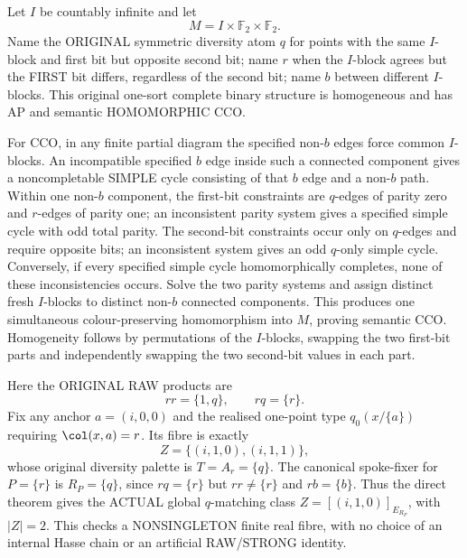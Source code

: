 \begin{example}
\label{ex:rh-direct-spoke-fixer-two-point}
Let $I$ be countably infinite and let
\[
                    M=I\times\mathbb F_2\times\mathbb F_2 .
\]
Name the ORIGINAL symmetric diversity
atom $q$ for points with the same
$I$-block and first bit but opposite
second bit; name $r$ when the
$I$-block agrees but the FIRST bit
differs, regardless of the second bit;
name $b$ between different $I$-blocks.
This original one-sort complete binary
structure is homogeneous and has AP
and semantic HOMOMORPHIC CCO.

For CCO, in any finite partial diagram
the specified non-$b$ edges force
common $I$-blocks. An incompatible
specified $b$ edge inside such a
connected component gives a
noncompletable SIMPLE cycle consisting
of that $b$ edge and a non-$b$ path.
Within one non-$b$ component, the
first-bit constraints are
$q$-edges of parity zero and
$r$-edges of parity one; an
inconsistent parity system gives a
specified simple cycle with odd
total parity. The second-bit
constraints occur only on $q$-edges
and require opposite bits; an
inconsistent system gives an odd
$q$-only simple cycle. Conversely,
if every specified simple cycle
homomorphically completes, none
of these inconsistencies occurs.
Solve the two parity systems
and assign distinct fresh
$I$-blocks to distinct non-$b$
connected components. This produces
one simultaneous colour-preserving
homomorphism into $M$, proving
semantic CCO. Homogeneity follows
by permutations of the $I$-blocks,
swapping the two first-bit parts
and independently swapping the
two second-bit values in each part.

Here the ORIGINAL RAW products are
\[
                  rr=\{1,q\},
                       \qquad rq=\{r\}.
\]
Fix any anchor $a=(i,0,0)$ and
the realised one-point type
$q_0(x/\{a\})$ requiring
$\col(x,a)=r$.
Its fibre is exactly
\[
        Z=\{(i,1,0),(i,1,1)\},
\]
whose original diversity palette
is $T=A_r=\{q\}$. The canonical
spoke-fixer for $P=\{r\}$ is
$R_P=\{q\}$, since $rq=\{r\}$
but $rr\ne\{r\}$ and $rb=\{b\}$.
Thus the direct theorem gives the
ACTUAL global $q$-matching class
$Z=[(i,1,0)]_{E_{R_P}}$, with
$|Z|=2$. This checks a NONSINGLETON
finite real fibre, with no choice
of an internal Hasse chain or
an artificial RAW/STRONG identity.
\end{example}

